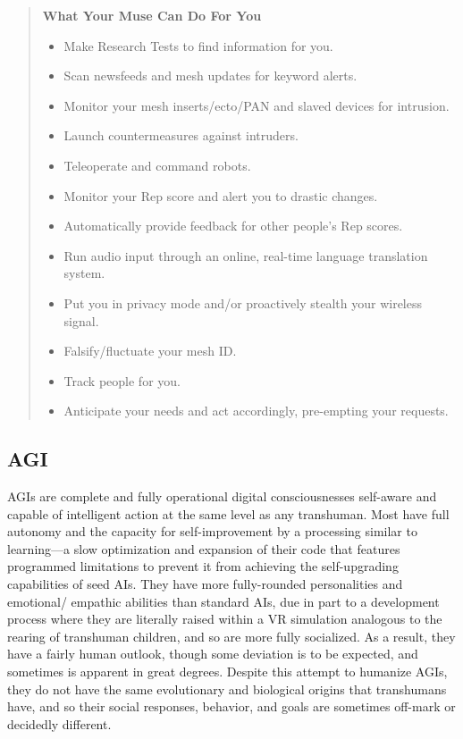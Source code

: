 \begin{quotation}
\textbf{What Your Muse Can Do For You}
\begin{itemize}
\item Make Research Tests to find information for you.
\item Scan newsfeeds and mesh updates for keyword alerts.
\item Monitor your mesh inserts/ecto/PAN and slaved devices for intrusion.
\item Launch countermeasures against intruders.
\item Teleoperate and command robots.
\item Monitor your Rep score and alert you to drastic changes.
\item Automatically provide feedback for other people’s Rep scores.
\item Run audio input through an online, real-time language translation system.
\item Put you in privacy mode and/or proactively stealth your wireless signal.
\item Falsify/fluctuate your mesh ID.
\item Track people for you.
\item Anticipate your needs and act accordingly, pre-empting your requests.
\end{itemize}
\end{quotation}

\subsection{AGI}

AGIs are complete and fully operational digital consciousnesses
self-aware and capable of intelligent
action at the same level as any transhuman. Most have 
full autonomy and the capacity for self-improvement 
by a processing similar to learning—a slow optimization
and expansion of their code that features
programmed limitations to prevent it from achieving
the self-upgrading capabilities of seed AIs. They
have more fully-rounded personalities and emotional/
empathic abilities than standard AIs, due in part to 
a development process where they are literally raised 
within a VR simulation analogous to the rearing of 
transhuman children, and so are more fully socialized. 
As a result, they have a fairly human outlook, though 
some deviation is to be expected, and sometimes is 
apparent in great degrees. Despite this attempt to humanize
AGIs, they do not have the same evolutionary
and biological origins that transhumans have, and so 
their social responses, behavior, and goals are sometimes
off-mark or decidedly different.

